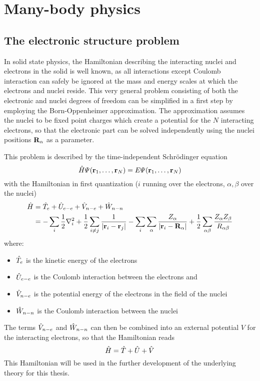 \documentclass[main.tex]{subfiles}
\begin{document}
\chapter{Many-body physics\label{chap:many-body-physics}}

\section{The electronic structure problem\label{sec:theory_schrödinger}}

In solid state physics, the Hamiltonian describing the interacting nuclei and electrons in the solid is well known, as all interactions except Coulomb interaction can safely be ignored at the mass and energy scales at which the electrons and nuclei reside.
This very general problem consisting of both the electronic and nuclei degrees of freedom can be simplified in a first step by employing the Born-Oppenheimer approximation.
The approximation assumes the nuclei to be fixed point charges which create a potential for the \(N\) interacting electrons, so that the electronic part can be solved independently using the nuclei positions \(\vb{R}_{\alpha}\) as a parameter.

This problem is described by the time-independent Schrödinger equation
\begin{equation}\label{}
    \hat{H} \Psi (\vb{r}_1, \ldots, \vb{r}_N) = E \Psi (\vb{r}_1, \ldots, \vb{r}_N)
\end{equation}
with the Hamiltonian in first quantization (\(i\) running over the electrons, \(\alpha, \beta\) over the nuclei)
\begin{align}
    \hat{H} &= \hat{T}_e + \hat{U}_{e-e} + \hat{V}_{n-e} + \hat{W}_{n-n} \\
    &= -\sum_i \frac{1}{2} \nabla^2_i 
    + \frac{1}{2} \sum_{i \neq j} \frac{1}{\vert \vb{r}_i - \vb{r}_j \vert} 
    - \sum_i \sum_{\alpha} \frac{Z_{\alpha}}{\vert \vb{r}_i 
    - \vb{R}_{\alpha} \vert} 
    + \frac{1}{2} \sum_{\alpha \beta} \frac{Z_{\alpha} Z_{\beta}}{R_{\alpha \beta}} 
\end{align}
where:
\begin{itemize}
    \item \(\hat{T}_e\) is the kinetic energy of the electrons
    \item \(\hat{U}_{e-e}\) is the Coulomb interaction between the electrons and
    \item \(\hat{V}_{n-e}\) is the potential energy of the electrons in the field of the nuclei
    \item \(\hat{W}_{n-n}\) is the Coulomb interaction between the nuclei
\end{itemize}
The terms \(\hat{V}_{n-e}\) and \(\hat{W}_{n-n}\) can then be combined into an external potential \(V\) for the interacting electrons, so that the Hamiltonian reads
\begin{equation}\label{eq:solid_state_hamiltonian}
    \hat{H} = \hat{T} + \hat{U} + \hat{V}
\end{equation}
This Hamiltonian will be used in the further development of the underlying theory for this thesis.
\end{document}
